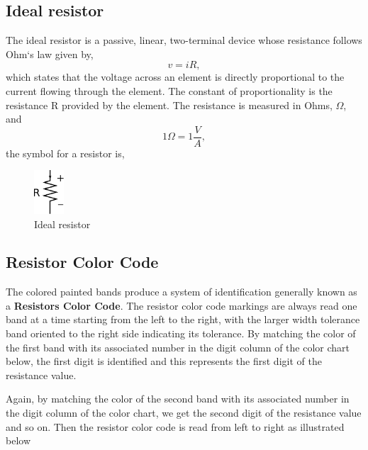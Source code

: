 \documentclass[a4 paper]{article}
\numberwithin{equation}{section}
\newcommand{\0}{\mathbf{0}}
\begin{document}

\subsection{Ideal resistor}
The ideal resistor is a passive, linear, two-terminal device whose resistance follows Ohm`s law given by,
\begin{equation}
v = iR,
\end{equation}
which states that the voltage across an element is directly proportional to the current flowing through the element. The constant of proportionality is the resistance R provided by the element. The resistance is measured in Ohms, $\Omega$, and
\begin{equation}
1 \Omega = 1 \frac{V}{A},
\end{equation}
the symbol for a resistor is,

\begin{figure}[!ht]
  \caption{Ideal resistor}
  \centering
  \includegraphics[width=0.1\textwidth]{./images/circuit1/resistor}
\end{figure}



\subsection{Resistor Color Code}
The colored painted bands produce a system of identification generally known as a {\bf Resistors Color Code}.
The resistor color code markings are always read one band at a time starting from the left to the right, with the larger width tolerance band oriented to the right side indicating its tolerance. By matching the color of the first band with its associated number in the digit column of the color chart below, the first digit is identified and this represents the first digit of the resistance value.

Again, by matching the color of the second band with its associated number in the digit column of the color chart, we get the second digit of the resistance value and so on. Then the resistor color code is read from left to right as illustrated below
\end{document}
